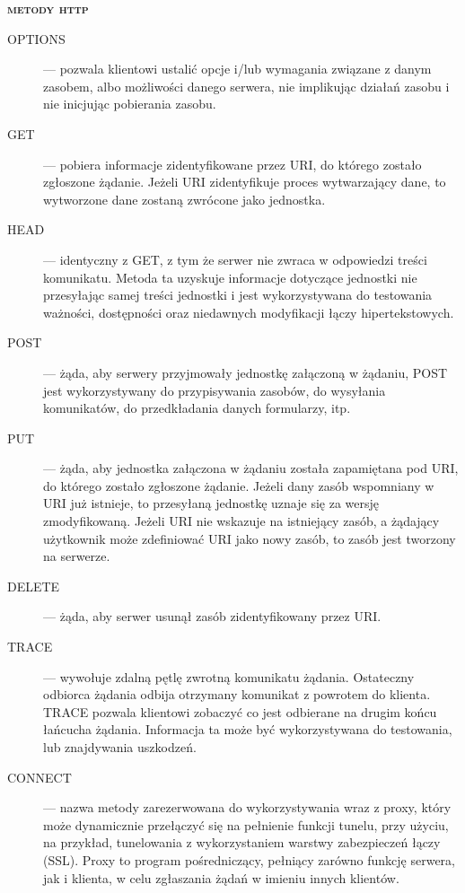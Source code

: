 \textsc{\textbf{metody http}}
\begin{description}

\item[OPTIONS] — pozwala klientowi ustalić opcje i/lub wymagania związane z danym zasobem, albo możliwości danego serwera, nie implikując działań zasobu i nie inicjując pobierania zasobu.
\item[GET] — pobiera informacje zidentyfikowane przez URI, do którego zostało zgłoszone żądanie. Jeżeli URI zidentyfikuje proces wytwarzający dane, to wytworzone dane zostaną zwrócone jako jednostka.

\item[HEAD] — identyczny z GET, z tym że serwer nie zwraca w odpowiedzi treści komunikatu. Metoda ta uzyskuje informacje dotyczące jednostki nie przesyłając samej treści jednostki i jest wykorzystywana do testowania ważności, dostępności oraz niedawnych modyfikacji łączy hipertekstowych.

\item[POST] — żąda, aby serwery przyjmowały jednostkę załączoną w żądaniu,  POST jest wykorzystywany do przypisywania zasobów, do wysyłania komunikatów, do przedkładania danych formularzy, itp.

\item[PUT] — żąda, aby jednostka załączona w żądaniu została zapamiętana pod URI, do którego zostało zgłoszone żądanie. Jeżeli dany zasób wspomniany w URI już istnieje, to przesyłaną jednostkę uznaje się za wersję zmodyfikowaną. Jeżeli URI nie wskazuje na istniejący zasób, a żądający użytkownik może zdefiniować URI jako nowy zasób, to zasób jest tworzony na serwerze.

\item[DELETE] — żąda, aby serwer usunął zasób zidentyfikowany przez URI.

\item[TRACE] — wywołuje zdalną pętlę zwrotną komunikatu żądania. Ostateczny odbiorca żądania odbija otrzymany komunikat z powrotem do klienta. TRACE pozwala klientowi zobaczyć co jest odbierane na drugim końcu łańcucha żądania. Informacja ta może być wykorzystywana do testowania, lub znajdywania uszkodzeń.

\item[CONNECT] — nazwa metody zarezerwowana do wykorzystywania wraz z proxy, który może dynamicznie przełączyć się na pełnienie funkcji tunelu, przy użyciu, na przykład, tunelowania z wykorzystaniem warstwy zabezpieczeń łączy (SSL). Proxy to program pośredniczący, pełniący zarówno funkcję serwera, jak i klienta, w celu zgłaszania żądań w imieniu innych klientów.
\end{description}

